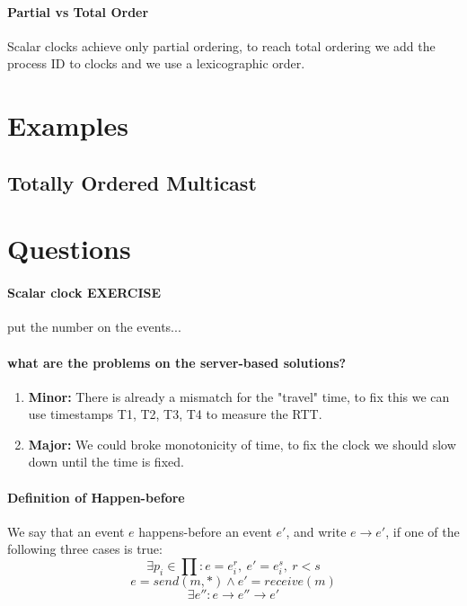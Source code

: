 \documentclass[11pt]{article}
\begin{document}
\paragraph{Partial vs Total Order} %
\label{par:partial_vs_total_order}
Scalar clocks achieve only partial ordering, to reach total ordering we add the process ID to clocks and we use a lexicographic order.


\section{Examples} %
\label{sec:examples}
\subsection{Totally Ordered Multicast} %
\label{sub:totally_ordered_multicast}


\section{Questions} %
\label{sec:questions}

\paragraph{Scalar clock EXERCISE} %
\label{par:scalar_clock_exercise}
put the number on the events...

\paragraph{what are the problems on the server-based solutions?} %
\label{par:q1}
\begin{enumerate}
	\item \textbf{Minor:} There is already a mismatch for the "travel" time, to fix this we can use timestamps T1, T2, T3, T4 to measure the RTT.
	\item \textbf{Major:} We could broke monotonicity of time, to fix the clock we should slow down until the time is fixed.
\end{enumerate}

\paragraph{Definition of Happen-before} %
\label{par:definition_of_happen_before}
We say that an event $e$ happens-before an event $e'$, and write $e \rightarrow e'$, if one of the following three cases is true:
\[
	\exists p_i \in \prod : e = e_i^r, \ e'= e^s_i,\ r < s
\]
\[
	e = send(m,*) \land e' = receive(m) 
\]
\[
	\exists e'': e \rightarrow e'' \rightarrow e' 
\]


\end{document}

